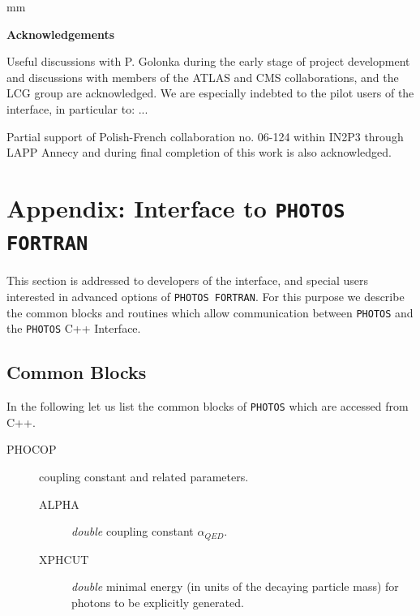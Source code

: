 \documentclass[]{Photos_interface_design}
\begin{document}
 mm

\centerline{\large\bf Acknowledgements}


Useful discussions with P. Golonka during the early stage of project development and discussions 
with members of the ATLAS and CMS collaborations, and the LCG group are acknowledged.
We are especially indebted to the pilot users of the interface, in particular to:
...

Partial support of Polish-French collaboration
no. 06-124 within IN2P3 through LAPP Annecy and 
during final completion of this work is
also acknowledged.

\newpage

{}
% 






\newpage
\appendix

\section{Appendix: Interface to {\tt PHOTOS FORTRAN}}
\label{Interface to PHOTOS}

This section is addressed to developers of the interface, 
and special users interested in advanced options of {\tt PHOTOS FORTRAN}.
For this purpose we describe the common blocks and routines which allow
communication between {\tt PHOTOS} and the {\tt PHOTOS} C++ Interface.

\subsection{Common Blocks}

In the following let us list the common blocks of {\tt PHOTOS} which are accessed
from C++.

\begin{description}
\item[PHOCOP] coupling constant and related parameters.
    \begin{description}
	\item[ALPHA]  \textit{double} coupling constant $\alpha_{QED}$.
	\item[XPHCUT] \textit{double} minimal energy (in units of the decaying particle mass) for photons to be explicitly generated.
    \end{description}
\end{description}
\end{document}
